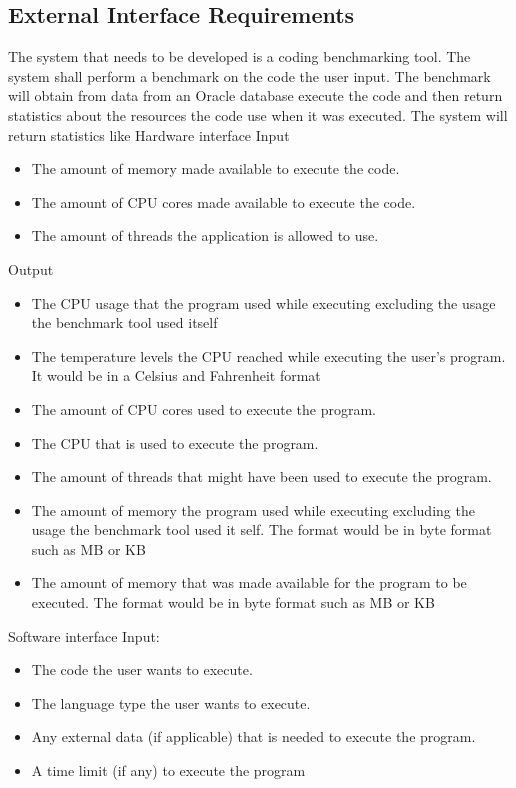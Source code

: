 \documentclass[a4paper,12pt]{article}
\begin{document}
\subsection{External Interface Requirements}
The system that needs to be developed is a coding benchmarking tool. The system shall perform a benchmark on the code the user input. The benchmark will obtain from data from an Oracle database execute the code and then return statistics about the resources the code use when it was executed. The system will return statistics like
Hardware interface
Input
\begin{itemize}
\item The amount of memory made available to execute the code.
\item The amount of CPU cores made available to execute the code. 
\item The amount of threads the application is allowed to use.
\end{itemize}
Output
\begin{itemize}
\item The CPU usage that the program used while executing excluding the usage the benchmark tool used itself
\item The temperature levels the CPU reached while executing the user's program. It would be in a Celsius and Fahrenheit format
\item The amount of CPU cores used to execute the program.
\item The CPU that is used to execute the program. 
\item The amount of threads that might have been used to execute the program. 
\item The amount of memory the program used while executing excluding the usage the benchmark tool used it self. The format would be in byte format such as MB or KB
\item The amount of memory that was made available for the program to be executed. The format would be in byte format such as MB or KB
\end{itemize}
Software interface
Input:
\begin{itemize}
\item The code the user wants to execute.
\item The language type the user wants to execute.
\item Any external  data (if applicable) that is needed to execute the program.
\item A time limit (if any) to execute the program
\end{itemize}
\end{document}
